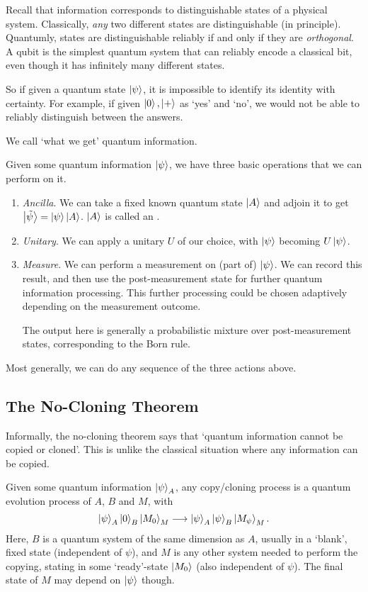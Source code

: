 \documentclass[a4paper]{article}
\begin{document}
Recall that information corresponds to distinguishable states of a physical system. Classically, \emph{any} two different states are distinguishable (in principle). Quantumly, states are distinguishable reliably if and only if they are \emph{orthogonal}.
A qubit is the simplest quantum system that can reliably encode a classical bit, even though it has infinitely many different states.

So if given a quantum state $\ket{\psi}$, it is impossible to identify its identity with certainty.
For example, if given $\ket{0}, \ket{+}$ as `yes' and `no', we would not be able to reliably distinguish between the answers.

We call `what we get' quantum information.

Given some quantum information $\ket{\psi}$, we have three basic operations that we can perform on it.
\begin{enumerate}
	\item \emph{Ancilla}. We can take a fixed known quantum state $\ket{A}$ and adjoin it to get $\ket{\tilde{\psi}} = \ket{\psi} \ket{A}$. $\ket{A}$ is called an .
	\item \emph{Unitary}. We can apply a unitary $U$ of our choice, with $\ket{\psi}$ becoming $U\ket{\psi}$.
	\item \emph{Measure}. We can perform a measurement on (part of) $\ket{\psi}$. We can record this result, and then use the post-measurement state for further quantum information processing. This further processing could be chosen adaptively depending on the measurement outcome.
	
	The output here is generally a probabilistic mixture over post-measurement states, corresponding to the Born rule.
\end{enumerate}
Most generally, we can do any sequence of the three actions above.

\subsection{The No-Cloning Theorem}

Informally, the no-cloning theorem says that `quantum information cannot be copied or cloned'. This is unlike the classical situation where any information can be copied.

Given some quantum information $\ket{\psi}_A$, any copy/cloning process is a quantum evolution process of $A$, $B$ and $M$, with
$$
\ket{\psi}_A \ket{0}_B \ket{M_0}_M \longrightarrow  \ket{\psi}_A \ket{\psi}_B \ket{M_{\psi}}_M.
$$
Here, $B$ is a quantum system of the same dimension as $A$, usually in a `blank', fixed state (independent of $\psi$), and $M$ is any other system needed to perform the copying, stating in some `ready'-state $\ket{M_0}$ (also independent of $\psi$). The final state of $M$ may depend on $\ket{\psi}$ though.
\end{document}
